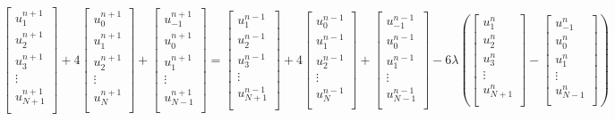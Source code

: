\documentclass{report}
\begin{document}
\begin{displaymath}
\left[
\begin{matrix}
u^{n+1}_{1} \\
u^{n+1}_{2} \\
u^{n+1}_{3} \\
\vdots\\
u^{n+1}_{N+1}\\
\end{matrix}
\right] 
%
+
%
4\left[
\begin{matrix}
u^{n+1}_{0} \\
u^{n+1}_{1} \\
u^{n+1}_{2} \\
\vdots\\
u^{n+1}_{N}\\
\end{matrix}
\right]
%
+
%
\left[
\begin{matrix}
u^{n+1}_{-1} \\
u^{n+1}_{0} \\
u^{n+1}_{1} \\
\vdots\\
u^{n+1}_{N-1}\\
\end{matrix}
\right]
%
=
%
\left[
\begin{matrix}
u^{n-1}_{1} \\
u^{n-1}_{2} \\
u^{n-1}_{3} \\
\vdots\\
u^{n-1}_{N+1}\\
\end{matrix}
\right] 
%
+
%
4\left[
\begin{matrix}
u^{n-1}_{0} \\
u^{n-1}_{1} \\
u^{n-1}_{2} \\
\vdots\\
u^{n-1}_{N}\\
\end{matrix}
\right]
%
+
%
\left[
\begin{matrix}
u^{n-1}_{-1} \\
u^{n-1}_{0} \\
u^{n-1}_{1} \\
\vdots\\
u^{n-1}_{N-1}\\
\end{matrix}
\right]
%
-6\lambda\left(
\left[
\begin{matrix}
u^{n}_{1} \\
u^{n}_{2} \\
u^{n}_{3}\\
\vdots\\
u^{n}_{N+1}\\
\end{matrix}
\right]
%
-
%
\left[
\begin{matrix}
u^{n}_{-1} \\
u^{n}_{0} \\
u^{n}_{1}\\
\vdots\\
u^{n}_{N-1}\\
\end{matrix}
\right]
\right)
\end{displaymath}
\end{document}
